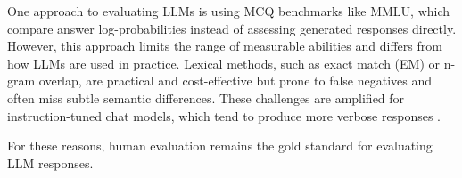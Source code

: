 
One approach to evaluating LLMs is using MCQ benchmarks like MMLU, which compare answer log-probabilities instead of assessing generated responses directly. However, this approach limits the range of measurable abilities and differs from how LLMs are used in practice. Lexical methods, such as exact match (EM) or n-gram overlap, are practical and cost-effective but prone to false negatives and often miss subtle semantic differences. These challenges are amplified for instruction-tuned chat models, which tend to produce more verbose responses \citep{saito2023verbosity, renze2024benefits}.

% 
For these reasons, human evaluation remains the gold standard for evaluating LLM responses. %

